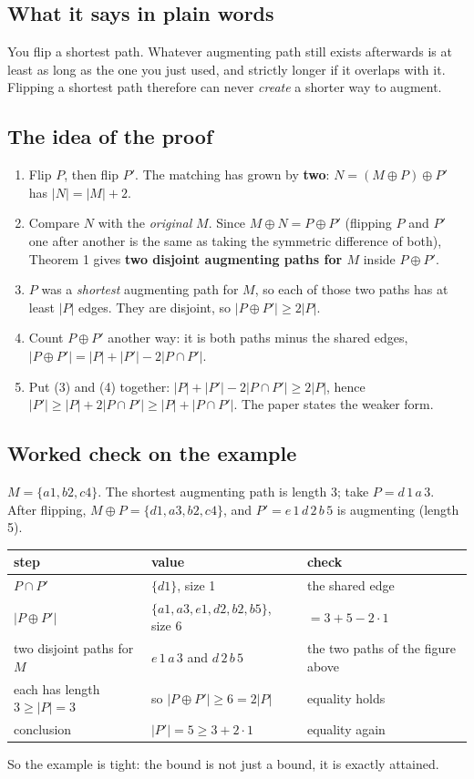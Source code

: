 \documentclass[11pt,a4paper]{article}
\begin{document}
\subsection*{What it says in plain words}
You flip a shortest path. Whatever augmenting path still exists afterwards is at least as long as the one you just used, and strictly longer if it overlaps with it. Flipping a shortest path therefore can never \emph{create} a shorter way to augment.

\subsection*{The idea of the proof}
\begin{enumerate}
  \item Flip $P$, then flip $P'$. The matching has grown by \textbf{two}: $N=(M\oplus P)\oplus P'$ has $|N|=|M|+2$.
  \item Compare $N$ with the \emph{original} $M$. Since $M\oplus N=P\oplus P'$ (flipping $P$ and $P'$ one after another is the same as taking the symmetric difference of both), Theorem 1 gives \textbf{two disjoint augmenting paths for $M$} inside $P\oplus P'$.
  \item $P$ was a \emph{shortest} augmenting path for $M$, so each of those two paths has at least $|P|$ edges. They are disjoint, so $|P\oplus P'|\ge 2|P|$.
  \item Count $P\oplus P'$ another way: it is both paths minus the shared edges, $|P\oplus P'|=|P|+|P'|-2|P\cap P'|$.
  \item Put (3) and (4) together: $|P|+|P'|-2|P\cap P'|\ge2|P|$, hence $|P'|\ge|P|+2|P\cap P'|\ge|P|+|P\cap P'|$. The paper states the weaker form.
\end{enumerate}

\subsection*{Worked check on the example}
$M=\{a1,b2,c4\}$. The shortest augmenting path is length 3; take $P=d\,1\,a\,3$. After flipping, $M\oplus P=\{d1,a3,b2,c4\}$, and $P'=e\,1\,d\,2\,b\,5$ is augmenting (length 5).
\begin{center}
\begin{tabular}{@{}lll@{}}
\toprule
step & value & check\\\midrule
$P\cap P'$ & $\{d1\}$, size 1 & the shared edge\\
$|P\oplus P'|$ & $\{a1,a3,e1,d2,b2,b5\}$, size $6$ & $=3+5-2\cdot1$\\
two disjoint paths for $M$ & $e\,1\,a\,3$ and $d\,2\,b\,5$ & the two paths of the figure above\\
each has length $3\ge|P|=3$ & so $|P\oplus P'|\ge6=2|P|$ & equality holds\\
conclusion & $|P'|=5\ge 3+2\cdot1$ & equality again\\\bottomrule
\end{tabular}
\end{center}
So the example is tight: the bound is not just a bound, it is exactly attained.
\end{document}
